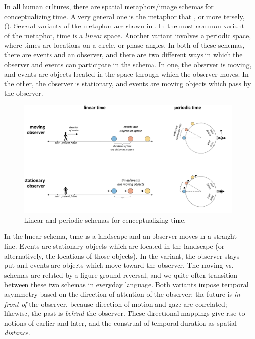 In all human cultures, there are spatial metaphors/image schemas for conceptualizing time. A very general one is the metaphor that {}, or more tersely, {} (\citealt{Boroditsky2000,Boroditsky2001,CasasantoBoroditsky2008,Evans2006,GentnerEtAl2002,LakoffJohnson1999,NúñezEtAl2006}). Several variants of the metaphor are shown in {}. In the most common variant of the metaphor, time is a \textit{linear} space. Another variant involves a periodic space, where times are locations on a circle, or phase angles. In both of these schemas, there are events and an observer, and there are two different ways in which the observer and events can participate in the schema. In one, the observer is moving, and events are objects located in the space through which the observer moves. In the other, the observer is stationary, and events are moving objects which pass by the observer.

  
\begin{figure}
\includegraphics[width=\textwidth]{figures/Tilsen-img38.png}
\caption{Linear and periodic schemas for conceptualizing time.}
\label{fig:3:10}
\end{figure}
 

  In the  linear schema, time is a landscape and an observer moves in a straight line. Events are stationary objects which are located in the landscape (or alternatively, the locations of those objects). In the  variant, the observer stays put and events are objects which move toward the observer. The moving vs.  schemas are related by a figure-ground reversal, and we quite often transition between these two schemas in everyday language. Both variants impose temporal asymmetry based on the direction of attention of the observer: the future is \textit{in front of} the observer, because direction of motion and gaze are correlated; likewise, the past is \textit{behind} the observer. These directional mappings give rise to notions of earlier and later, and the construal of temporal duration as spatial \textit{distance}. 

